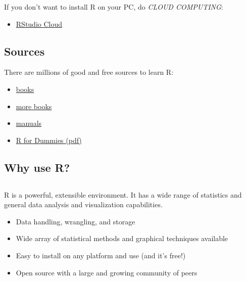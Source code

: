 \documentclass[
]{article}
\providecommand{\tightlist}{%
  \setlength{\itemsep}{0pt}\setlength{\parskip}{0pt}}
\begin{document}
If you don't want to install R on your PC, do \emph{CLOUD COMPUTING}:

\begin{itemize}
\tightlist
\item
  \href{https://rstudio.cloud/}{RStudio Cloud}
\end{itemize}

\hypertarget{sources}{%
\subsection{Sources}\label{sources}}

There are millions of good and free sources to learn R:

\begin{itemize}
\tightlist
\item
  \href{http://ucanalytics.com/blogs/learn-r-12-books-and-online-resources/}{books}
\item
  \href{https://rstudio.com/resources/books/}{more books}
\item
  \href{https://cran.r-project.org/manuals.html}{manuals}
\item
  \href{http://sgpwe.izt.uam.mx/files/users/uami/gma/R_for_dummies.pdf}{R
  for Dummies (pdf)}
\end{itemize}

\hypertarget{why-use-r}{%
\subsection{Why use R?}\label{why-use-r}}

\hypertarget{section}{%
\subsection{}\label{section}}

R is a powerful, extensible environment. It has a wide range of
statistics and general data analysis and visualization capabilities.

\begin{itemize}
\tightlist
\item
  Data handling, wrangling, and storage
\item
  Wide array of statistical methods and graphical techniques available
\item
  Easy to install on any platform and use (and it's free!)
\item
  Open source with a large and growing community of peers
\end{itemize}
\end{document}
